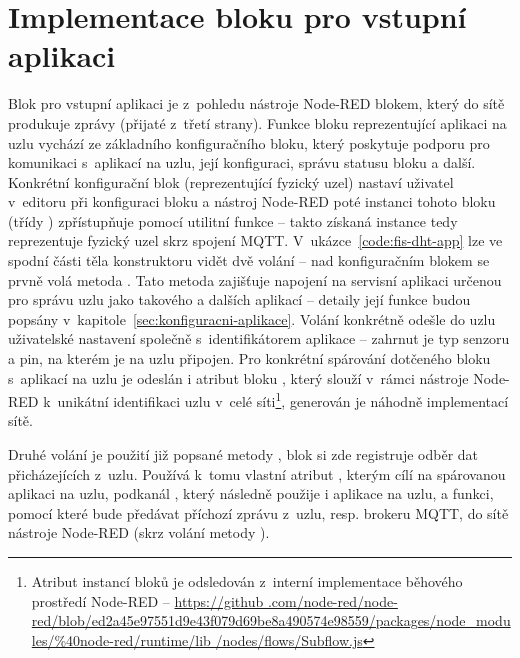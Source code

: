 \section{Implementace bloku pro vstupní aplikaci}\label{sec:implementace-bloku-pro-vstupni-aplikaci}
Blok pro vstupní aplikaci je z~pohledu nástroje Node-RED blokem, který do sítě produkuje zprávy (přijaté z~třetí
strany).
Funkce bloku reprezentující aplikaci na uzlu vychází ze základního konfiguračního bloku, který poskytuje podporu pro
komunikaci s~aplikací na uzlu, její konfiguraci, správu statusu bloku a další.
Konkrétní konfigurační blok (reprezentující fyzický uzel) nastaví uživatel v~editoru při konfiguraci bloku a nástroj
Node-RED poté instanci tohoto bloku (třídy ) zpřístupňuje pomocí utilitní funkce
\mbox{} -- takto získaná instance tedy reprezentuje fyzický uzel skrz spojení MQTT.
V~ukázce~\ref{code:fis-dht-app} lze ve spodní části těla konstruktoru vidět dvě volání -- nad konfiguračním blokem se
prvně volá metoda .
Tato metoda zajišťuje napojení na servisní aplikaci určenou pro správu uzlu jako takového a dalších aplikací --
detaily její funkce budou popsány v~kapitole~\ref{sec:konfiguracni-aplikace}.
Volání konkrétně odešle do uzlu uživatelské nastavení společně s~identifikátorem aplikace  -- zahrnut
je typ senzoru a pin, na kterém je na uzlu připojen.
Pro konkrétní spárování dotčeného bloku s~aplikací na uzlu je odeslán i atribut bloku , který slouží
v~rámci nástroje Node-RED k~unikátní identifikaci uzlu v~celé síti\footnote{Atribut  instancí bloků je
odsledován z~interní implementace běhového prostředí Node-RED -- \url{https://github
.com/node-red/node-red/blob/ed2a45e97551d9e43f079d69be8a490574e98559/packages/node_modules/\%40node-red/runtime/lib
/nodes/flows/Subflow.js}}, generován je náhodně implementací sítě.

Druhé volání je použití již popsané metody , blok si zde registruje odběr dat přicházejících
z~uzlu.
Používá k~tomu vlastní atribut , kterým cílí na spárovanou aplikaci na uzlu, podkanál , který
následně použije i aplikace na uzlu, a funkci, pomocí které bude předávat příchozí zprávu z~uzlu, resp. brokeru MQTT,
do sítě nástroje Node-RED (skrz volání metody ).

